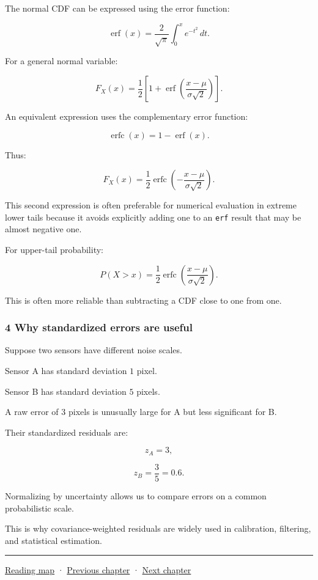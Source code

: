 The normal CDF can be expressed using the error function:

\[
 \operatorname{erf}(x)= \frac2{\sqrt\pi} \int_0^xe^{-t^2}\,dt.
\]

For a general normal variable:

\[
 \boxed{ F_X(x) = \frac12\left[ 1+\operatorname{erf} \left(\frac{x-\mu}{\sigma\sqrt2}\right) \right] }.
\]

An equivalent expression uses the complementary error function:

\[
 \operatorname{erfc}(x)=1-\operatorname{erf}(x).
\]

Thus:

\[
 \boxed{ F_X(x) = \frac12\operatorname{erfc} \left( -\frac{x-\mu}{\sigma\sqrt2} \right) }.
\]

This second expression is often preferable for numerical evaluation in extreme lower tails because it avoids explicitly adding one to an \texttt{erf} result that may be almost negative one.

For upper-tail probability:

\[
 P(X>x) = \frac12\operatorname{erfc} \left( \frac{x-\mu}{\sigma\sqrt2} \right).
\]

This is often more reliable than subtracting a CDF close to one from one.

\subsubsection{4 Why standardized errors are useful}\label{02-foundations-ii-ch023-why-standardized-errors-are-useful}

Suppose two sensors have different noise scales.

Sensor A has standard deviation \(1\) pixel.

Sensor B has standard deviation \(5\) pixels.

A raw error of \(3\) pixels is unusually large for A but less significant for B.

Their standardized residuals are:

\[
 z_A=3,
\]

\[
 z_B=\frac35=0.6.
\]

Normalizing by uncertainty allows us to compare errors on a common probabilistic scale.

This is why covariance-weighted residuals are widely used in calibration, filtering, and statistical estimation.

\begin{center}\rule{0.5\linewidth}{0.5pt}\end{center}

\hyperref[volume-reading-map]{Reading map} · \hyperref[02-foundations-ii-ch022-accumulation-quadrature-and-the-bridge-to-probability]{Previous chapter} · \hyperref[02-foundations-ii-ch024-waiting-times-covariance-and-matrix-decomposition]{Next chapter}

